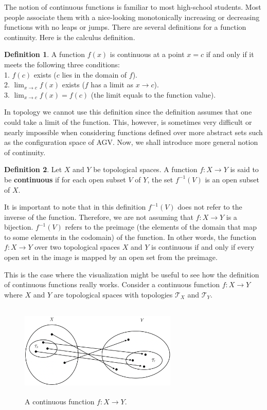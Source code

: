 \documentclass[12pt]{article}
\newcommand{\topology}{\mathcal{T}}                       %
\newcommand{\rarr}{\rightarrow}                           %
\theoremstyle{definition}
\newtheorem*{definition}{Definition}
\begin{document}
The notion of continuous functions is familiar to most high-school students.
Most people associate them with a nice-looking monotonically increasing or decreasing
functions with no leaps or jumps. There are several definitions for a function continuity.
Here is the calculus definition.

\begin{definition}
\cite{5} A function $f(x)$ is continuous at a point $x = c$ if and only if it meets the following
three conditions:\\
1. $f(c)$ exists ($c$ lies in the domain of $f$).\\
2. $\lim_{x \to c}f(x)$ exists ($f$ has a limit as $x \to c$).\\
3. $\lim_{x \to c}f(x) = f(c)$ (the limit equals to the function value).
\end{definition}

In topology we cannot use this definition since the definition assumes
that one could take a limit of the function. This, however, is sometimes very difficult or nearly impossible
when considering functions defined over more abstract sets such as the configuration space
of AGV. Now, we shall introduce more general notion of continuity.

\begin{definition}
\cite{6} Let $X$ and $Y$ be topological spaces. A function $f : X \to Y$ is said to be \textbf{continuous} if
for each open subset $V$ of $Y$, the set $f^{-1}(V)$ is an open subset of $X$.
\end{definition}

It is important to note that in this definition $f^{-1}(V)$ does not refer to the inverse of the function.
Therefore, we are not assuming that $f : X \rarr Y$ is a bijection. $f^{-1}(V)$ refers to the preimage
(the elements of the domain that map to some elements in the codomain) of the function. In other words,
the function $f : X \to Y$ over two topological spaces $X$ and $Y$ is continuous if and only if every open
set in the image is mapped by an open set from the preimage.

\bigskip

This is the case where the visualization might be useful to see how the definition of continuous functions really works.
Consider a continuous function $f : X \to Y$ where $X$ and $Y$ are topological spaces with topologies $\topology_X$ and $\topology_Y$.

\begin{figure}[H]
    \centering
    \includegraphics[width=7.5cm, height=4.5cm]{image/continuous-function}
    \caption*{A continuous function $f : X \to Y$.}
\end{figure}
\end{document}
